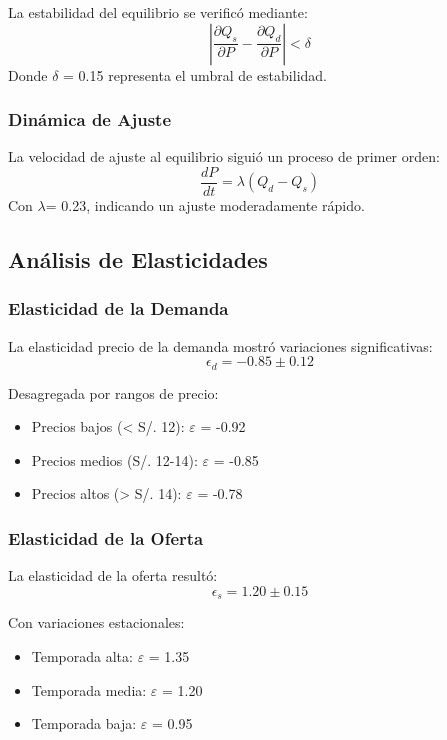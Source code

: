 \documentclass[12pt, a4paper]{article}
\begin{document}
La estabilidad del equilibrio se verificó mediante:
\begin{equation}
    \left|\frac{\partial Q_s}{\partial P} - \frac{\partial Q_d}{\partial P}\right| < \delta
\end{equation}
Donde $\delta$ = 0.15 representa el umbral de estabilidad.

\subsubsection{Dinámica de Ajuste}
La velocidad de ajuste al equilibrio siguió un proceso de primer orden:
\[ \frac{dP}{dt} = \lambda(Q_d - Q_s) \]
Con $\lambda$= 0.23, indicando un ajuste moderadamente rápido.

\subsection{Análisis de Elasticidades}
\subsubsection{Elasticidad de la Demanda}
La elasticidad precio de la demanda mostró variaciones significativas:
\begin{equation}
    \epsilon_d = -0.85 \pm 0.12
\end{equation}

Desagregada por rangos de precio:
\begin{itemize}
    \item Precios bajos (< S/. 12): $\varepsilon$ = -0.92
    \item Precios medios (S/. 12-14): $\varepsilon$ = -0.85
    \item Precios altos (> S/. 14): $\varepsilon$ = -0.78
\end{itemize}

\subsubsection{Elasticidad de la Oferta}
La elasticidad de la oferta resultó:
\begin{equation}
    \epsilon_s = 1.20 \pm 0.15
\end{equation}

Con variaciones estacionales:
\begin{itemize}
    \item Temporada alta: $\varepsilon$ = 1.35
    \item Temporada media: $\varepsilon$ = 1.20
    \item Temporada baja: $\varepsilon$ = 0.95
\end{itemize}
\end{document}
